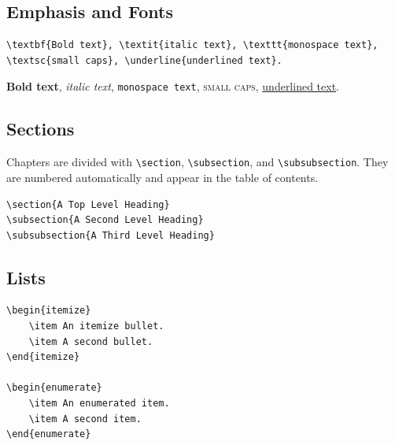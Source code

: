 \subsection{Emphasis and Fonts}

\begin{lstlisting}[style=latexstyle]
\textbf{Bold text}, \textit{italic text}, \texttt{monospace text},
\textsc{small caps}, \underline{underlined text}.
\end{lstlisting}

\textbf{Bold text}, \textit{italic text}, \texttt{monospace text}, \textsc{small caps}, \underline{underlined text}.

\subsection{Sections}

Chapters are divided with \lstinline|\section|, \lstinline|\subsection|, and \lstinline|\subsubsection|. They are numbered automatically and appear in the table of contents.

\begin{lstlisting}[style=latexstyle]
\section{A Top Level Heading}
\subsection{A Second Level Heading}
\subsubsection{A Third Level Heading}
\end{lstlisting}

\subsection{Lists}

\begin{lstlisting}[style=latexstyle]
\begin{itemize}
	\item An itemize bullet.
	\item A second bullet.
\end{itemize}

\begin{enumerate}
	\item An enumerated item.
	\item A second item.
\end{enumerate}
\end{lstlisting}


